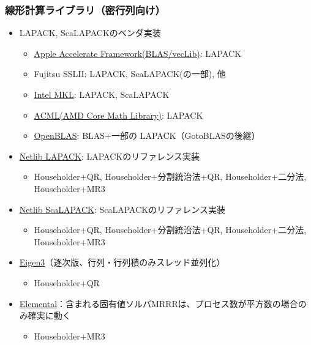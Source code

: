 \begin{frame}
  \frametitle{線形計算ライブラリ（密行列向け）}
  \begin{itemize}
  \item LAPACK, ScaLAPACKのベンダ実装
    \begin{itemize}
    \item \href{https://developer.apple.com/library/mac/documentation/Accelerate/Reference/AccelerateFWRef/index.html}{Apple Accelerate Framework(BLAS/vecLib)}: LAPACK
    \item Fujitsu SSLII: LAPACK, ScaLAPACK(の一部), 他
    \item \href{https://software.intel.com/en-us/mkl_11.1_ref}{Intel MKL}: LAPACK, ScaLAPACK
    \item
      \href{http://developer.amd.com/tools-and-sdks/cpu-development/amd-core-math-library-acml/}{ACML(AMD
        Core Math Library)}: LAPACK
    \item \href{http://www.openblas.net}{OpenBLAS}: BLAS+一部の
      LAPACK（GotoBLASの後継）

    \end{itemize}
  \item \href{http://www.netlib.org/lapack/}{Netlib LAPACK}: LAPACKのリファレンス実装
    \begin{itemize}
      \item Householder+QR, Householder+分割統治法+QR, Householder+二分法, Householder+MR3
    \end{itemize}
  \item \href{http://www.netlib.org/scalapack/}{Netlib ScaLAPACK}: ScaLAPACKのリファレンス実装
    \begin{itemize}
      \item Householder+QR, Householder+分割統治法+QR, Householder+二分法, Householder+MR3
    \end{itemize}
  \item \href{http://eigen.tuxfamily.org/}{Eigen3}（逐次版、行列・行列積のみスレッド並列化）
    \begin{itemize}
      \item Householder+QR
    \end{itemize}
  \item \href{http://libelemental.org}{Elemental}：含まれる固有値ソルバMRRRは、プロセス数が平方数の場合のみ確実に動く
    \begin{itemize}
      \item Householder+MR3
    \end{itemize}
  \end{itemize}
\end{frame}

